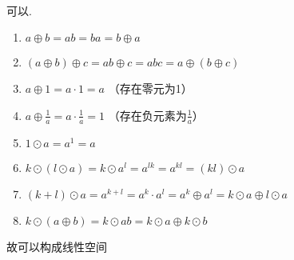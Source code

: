 	 \paragraph{} %
		 可以.
		 \begin{enumerate}
			 \item %
			       \(a \oplus b = ab = ba = b \oplus a\)
			 \item %
			       \((a \oplus b) \oplus c = ab \oplus c = abc = a \oplus (b \oplus c)\)
			 \item %
			       \(a \oplus 1 = a \cdot 1 = a\) （存在零元为1）
			 \item %
			       \(a \oplus \frac{1}{a} = a \cdot \frac{1}{a} = 1\) （存在负元素为\(\frac{1}{a}\)）
			 \item %
			       \(1 \odot a = a^{1} = a\)
			 \item %
			       \(k \odot (l \odot a) = k \odot a^{l} = a^{lk} = a^{kl} = (kl) \odot a\)
			 \item %
			       \((k + l) \odot a = a^{k + l} = a^{k} \cdot a^{l} = a^{k} \oplus a^{l} = k \odot a \oplus l \odot a\)
			 \item %
			       \(k \odot (a \oplus b) = k \odot ab = k \odot a \oplus k \odot b\)
		 \end{enumerate}
		 故可以构成线性空间


